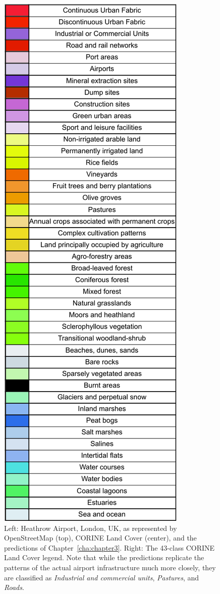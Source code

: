 \begin{figure}[H]
\begin{minipage}{0.5\textwidth}
                \includegraphics[width=\linewidth,height=2.15\textwidth,keepaspectratio]{figs_01/corine_legend.pdf}
                \caption{Left: Heathrow Airport, London, UK, as represented by OpenStreetMap (top), CORINE Land Cover (center), and the predictions of Chapter~\ref{cha:chapter3}. Right: The 43-class CORINE Land Cover legend. Note that while the predictions replicate the patterns of the actual airport infrastructure much more closely, they are classified as \textit{Industrial and commercial units}, \textit{Pastures}, and \textit{Roads}.}
            \end{minipage}
            \label{fig:heathrow}
        \end{figure}

